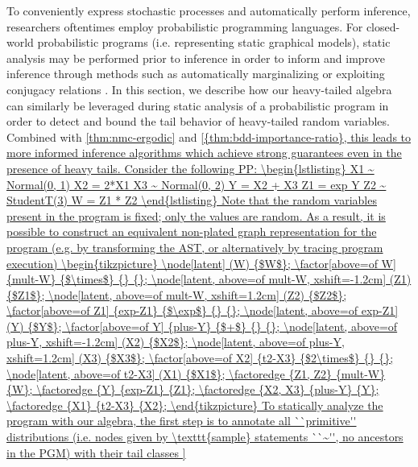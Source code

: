 \documentclass{article}
\theoremstyle{definition}
\begin{document}
To conveniently express stochastic processes and automatically perform inference,
researchers oftentimes employ probabilistic programming languages. For closed-world
probabilistic programs (i.e. representing static graphical models), static analysis
may be performed prior to inference in order to inform and improve
inference through methods such as automatically marginalizing \cite{murray2018automated} 
or exploiting conjugacy relations \cite{hoffman2018autoconj}. In this section, we describe
how our heavy-tailed algebra can similarly be leveraged during static analysis of a
probabilistic program in order to detect and bound the tail behavior of heavy-tailed
random variables. Combined with \cref{thm:nmc-ergodic} and \cref{{thm:bdd-importance-ratio},
this leads to more informed inference algorithms which achieve strong guarantees even in the presence of heavy tails.

Consider the following PP:
\begin{lstlisting}
    X1 ~ Normal(0, 1)
    X2 = 2*X1
    X3 ~ Normal(0, 2)
    Y = X2 + X3
    Z1 = exp Y
    Z2 ~ StudentT(3)
    W = Z1 * Z2
\end{lstlisting}

Note that the random variables present in the program is fixed; only the values are random.
As a result, it is possible to construct an equivalent non-plated graph representation for the program
(e.g. by transforming the AST, or alternatively by tracing program execution)

\begin{tikzpicture}
  \node[latent]                               (W) {$W$};
  \factor[above=of W] {mult-W} {$\times$} {} {};
  \node[latent, above=of mult-W, xshift=-1.2cm] (Z1) {$Z1$};
  \node[latent, above=of mult-W, xshift=1.2cm]  (Z2) {$Z2$};
  \factor[above=of Z1] {exp-Z1} {$\exp$} {} {};
  \node[latent, above=of exp-Z1] (Y) {$Y$};
  \factor[above=of Y] {plus-Y} {$+$} {} {};
  \node[latent, above=of plus-Y, xshift=-1.2cm] (X2) {$X2$};
  \node[latent, above=of plus-Y, xshift=1.2cm] (X3) {$X3$};
  \factor[above=of X2] {t2-X3} {$2\times$} {} {};
  \node[latent, above=of t2-X3] (X1) {$X1$};
  
  \factoredge {Z1, Z2} {mult-W} {W};
  \factoredge {Y} {exp-Z1} {Z1};
  \factoredge {X2, X3} {plus-Y} {Y};
  \factoredge {X1} {t2-X3} {X2};
\end{tikzpicture}

To statically analyze the program with our algebra, the first step is to annotate all ``primitive'' distributions
(i.e. nodes given by \texttt{sample} statements ``~'', no ancestors in the PGM) with their tail classes

}
\end{document}
